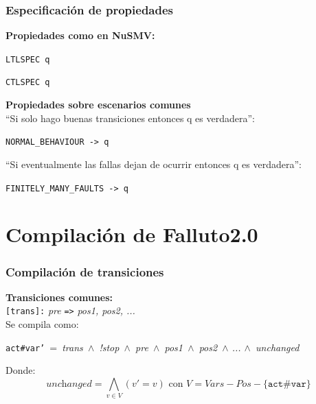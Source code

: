 \documentclass[serif]{beamer}
\begin{document}
\begin{frame}
\frametitle{Especificación de propiedades}
\textbf{Propiedades como en NuSMV:}\\[0.3cm]
\begin{center}\texttt{LTLSPEC q}

\texttt{CTLSPEC q}\end{center}
\textbf{Propiedades sobre escenarios comunes}\\[0.3cm]
``Si solo hago buenas transiciones entonces q es verdadera'':\\[0.2cm]
\begin{center} \texttt{NORMAL\_BEHAVIOUR -> q}\end{center}
``Si eventualmente las fallas dejan de ocurrir entonces q es
verdadera'':\\[0.2cm]
\begin{center} \texttt{FINITELY\_MANY\_FAULTS -> q}\end{center}
\end{frame}


\section[Compilaci\'on]{Compilación de Falluto2.0}


\begin{frame}
\frametitle{Compilación de transiciones}
\textbf{\Large Transiciones comunes:}\\[0.3cm]
\texttt{[trans]:} \textit{pre} \texttt{=>} \textit{pos1, pos2, ...}\\[0.3cm]
Se compila como:
\begin{framed}
\texttt{act\#var'}~=~\textit{trans~$\wedge$~!stop~$\wedge$~pre~$\wedge$~pos1~$\wedge$~pos2~$\wedge$ ... $\wedge$~unchanged}
\end{framed}
Donde:
$$\textit{unchanged} = \bigwedge_{v\in V}(v' = v) \text{ con }V = \textit{Vars} - \textit{Pos} - \{\texttt{act\#var}\}$$

\end{frame}
\end{document}
